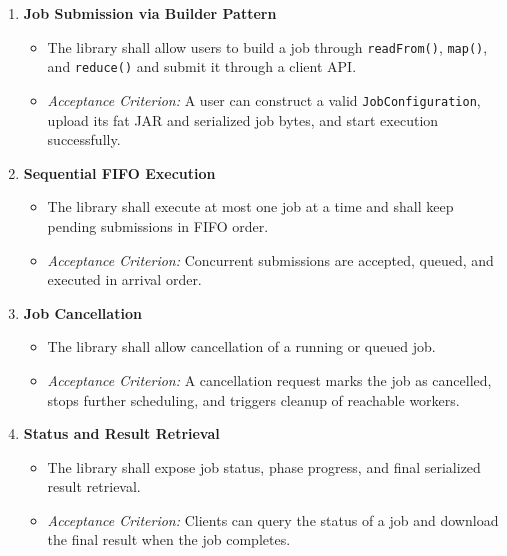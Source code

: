 \documentclass{scrartcl}
\begin{document}
\begin{enumerate}[label=\textbf{FR-JM-\arabic*}]
    \item \textbf{Job Submission via Builder Pattern}
          \begin{itemize}
              \item The library shall allow users to build a job through \texttt{readFrom()}, \texttt{map()}, and \texttt{reduce()} and submit it through a client API.
              \item \textit{Acceptance Criterion:} A user can construct a valid \texttt{JobConfiguration}, upload its fat JAR and serialized job bytes, and start execution successfully.
          \end{itemize}

    \item \textbf{Sequential FIFO Execution}
          \begin{itemize}
              \item The library shall execute at most one job at a time and shall keep pending submissions in FIFO order.
              \item \textit{Acceptance Criterion:} Concurrent submissions are accepted, queued, and executed in arrival order.
          \end{itemize}

    \item \textbf{Job Cancellation}
          \begin{itemize}
              \item The library shall allow cancellation of a running or queued job.
              \item \textit{Acceptance Criterion:} A cancellation request marks the job as cancelled, stops further scheduling, and triggers cleanup of reachable workers.
          \end{itemize}

    \item \textbf{Status and Result Retrieval}
          \begin{itemize}
              \item The library shall expose job status, phase progress, and final serialized result retrieval.
              \item \textit{Acceptance Criterion:} Clients can query the status of a job and download the final result when the job completes.
          \end{itemize}
\end{enumerate}
\end{document}
